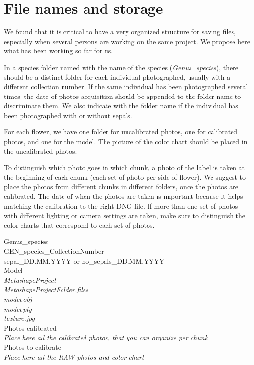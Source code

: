 \documentclass[
]{book}
\theoremstyle{definition}
\theoremstyle{definition}
\theoremstyle{definition}
\theoremstyle{definition}
\theoremstyle{remark}
\begin{document}
\hypertarget{file-names-and-storage}{%
\section{File names and storage}\label{file-names-and-storage}}

We found that it is critical to have a very organized structure for
saving files, especially when several persons are working on the same
project. We propose here what has been working so far for us.

In a species folder named with the name of the species
(\emph{Genus\_species}), there should be a distinct folder for each individual
photographed, usually with a different collection number. If the same
individual has been photographed several times, the date of photos
acquisition should be appended to the folder name to discriminate them.
We also indicate with the folder name if the individual has been
photographed with or without sepals.

For each flower, we have one folder for uncalibrated photos, one for
calibrated photos, and one for the model. The picture of the color chart
should be placed in the uncalibrated photos.

To distinguish which photo goes in which chunk, a photo of the label is
taken at the beginning of each chunk (each set of photo per side of
flower). We suggest to place the photos from different chunks in
different folders, once the photos are calibrated. The date of when the
photos are taken is important because it helps matching the calibration
to the right DNG file. If more than one set of photos with different
lighting or camera settings are taken, make sure to distinguish the
color charts that correspond to each set of photos.

Genus\_species\\
GEN\_species\_CollectionNumber\\
sepal\_DD.MM.YYYY or no\_sepals\_DD.MM.YYYY\\
Model\\
\emph{MetashapeProject}\\
\emph{MetashapeProjectFolder.files}\\
\emph{model.obj}\\
\emph{model.ply}\\
\emph{texture.jpg}\\
Photos calibrated\\
\emph{Place here all the calibrated photos, that you can organize per chunk}\\
Photos to calibrate\\
\emph{Place here all the RAW photos and color chart}\\
\end{document}
